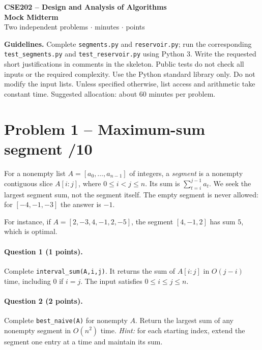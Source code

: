 \documentclass[11pt,a4paper]{article}
\newcommand{\q}[2]{\paragraph{Question #1 (#2 points).}}
\begin{document}
\begin{center}{\large\bfseries CSE202 -- Design and Analysis of Algorithms}\\[3pt]{\LARGE\bfseries Mock Midterm}\\[4pt]Two independent problems \quad $\cdot$  minutes \quad $\cdot$  points\end{center}
\textbf{Guidelines.} Complete \texttt{segments.py} and \texttt{reservoir.py}; run the corresponding \texttt{test\_segments.py} and \texttt{test\_reservoir.py} using Python 3. Write the requested short justifications in comments in the skeleton. Public tests do not check all inputs or the required complexity. Use the Python standard library only. Do not modify the input lists. Unless specified otherwise, list access and arithmetic take constant time. Suggested allocation: about 60 minutes per problem.
\section*{Problem 1 -- Maximum-sum segment \hfill /10}
For a nonempty list $A=[a_0,\ldots,a_{n-1}]$ of integers, a \emph{segment} is a nonempty contiguous slice $A[i:j]$, where $0\le i<j\le n$. Its sum is $\sum_{t=i}^{j-1}a_t$. We seek the largest segment sum, not the segment itself. The empty segment is never allowed: for $[-4,-1,-3]$ the answer is $-1$.

For instance, if $A=[2,-3,4,-1,2,-5]$, the segment $[4,-1,2]$ has sum $5$, which is optimal.
\q{1}{1} Complete \texttt{interval\_sum(A,i,j)}. It returns the sum of $A[i:j]$ in $O(j-i)$ time, including $0$ if $i=j$. The input satisfies $0\le i\le j\le n$.
\q{2}{2} Complete \texttt{best\_naive(A)} for nonempty $A$. Return the largest sum of any nonempty segment in $O(n^2)$ time. \emph{Hint:} for each starting index, extend the segment one entry at a time and maintain its sum.
\newpage
\end{document}
